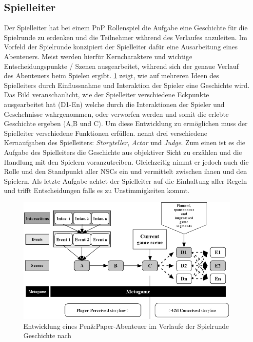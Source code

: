 \subsection{Spielleiter}
\label{sec:Spielleiter}
Der Spielleiter hat bei einem PnP Rollenspiel die Aufgabe eine Geschichte für die Spielrunde zu erdenken und die Teilnehmer während des Verlaufes anzuleiten. Im Vorfeld der Spielrunde konzipiert der Spielleiter dafür eine Ausarbeitung eines Abenteuers. Meist werden hierfür Kerncharaktere und wichtige Entscheidungspunkte / Szenen ausgearbeitet, während sich der genaue Verlauf des Abenteuers beim Spielen ergibt. \ref{fig:storyflow_pnp} zeigt, wie auf mehreren Ideen des Spielleiters durch Einflussnahme und Interaktion der Spieler eine Geschichte wird. Das Bild veranschaulicht, wie der Spielleiter verschiedene Eckpunkte ausgearbeitet hat (D1-En) welche durch die Interaktionen der Spieler und Geschehnisse wahrgenommen, oder verworfen werden und somit die erlebte Geschichte ergeben (A,B und C). Um diese Entwicklung zu ermöglichen muss der Spielleiter verschiedene Funktionen erfüllen.\newline
\cite{Arinbjarnar} nennt drei verschiedene Kernaufgaben des Spielleiters: \emph{Storyteller}, \emph{Actor} und \emph{Judge}. Zum einen ist es die Aufgabe des Spielleiters die Geschichte aus objektiver Sicht zu erzählen und die Handlung mit den Spielern voranzutreiben. Gleichzeitig nimmt er jedoch auch die Rolle und den Standpunkt aller NSCs ein und vermittelt zwischen ihnen und den Spielern. Als letzte Aufgabe achtet der Spielleiter auf die Einhaltung aller Regeln und trifft Entscheidungen falls es zu Unstimmigkeiten kommt.
\begin{figure}
	\centering
		\includegraphics[width=1.00\textwidth]{media/storyflow_pnp.png}
	\caption{Entwicklung eines Pen\&Paper-Abenteuer im Verlaufe der Spielrunde Geschichte nach \cite{Tychsen2006a}}
	\label{fig:storyflow_pnp}
\end{figure}




